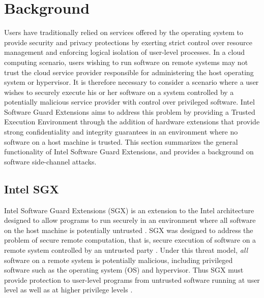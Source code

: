 \section{Background}

Users have traditionally relied on services offered by the operating system to provide security and privacy protections by exerting strict control over resource management and enforcing logical isolation of user-level processes. In a cloud computing scenario, users wishing to run software on remote systems may not trust the cloud service provider responsible for administering the host operating system or hypervisor. It is therefore necessary to consider a scenario where a user wishes to securely execute his or her software on a system controlled by a potentially malicious service provider with control over privileged software. Intel Software Guard Extensions aims to address this problem by providing a Trusted Execution Environment through the addition of hardware extensions that provide strong confidentiality and integrity guarantees in an environment where no software on a host machine is trusted. This section summarizes the general functionality of Intel Software Guard Extensions, and provides a background on software side-channel attacks.

\subsection{Intel SGX}

Intel Software Guard Extensions (SGX) is an extension to the Intel architecture designed to allow programs to run securely in an environment where all software on the host machine is potentially untrusted \cite{intel_corporation_intel_2016}. SGX was designed to address the problem of secure remote computation, that is, secure execution of software on a remote system controlled by an untrusted party \cite{intel_corporation_intel_2016}. Under this threat model, \emph{all} software on a remote system is potentially malicious, including privileged software such as the operating system (OS) and hypervisor. Thus SGX must provide protection to user-level programs from untrusted software running at user level as well as at higher privilege levels \cite{costan_intel_2016}. 

